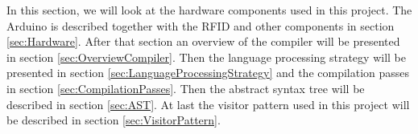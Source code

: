 In this section, we will look at the hardware components used in this project. The Arduino is described together with the RFID and other components in section \ref{sec:Hardware}. After that section an overview of the compiler will be presented in section \ref{sec:OverviewCompiler}. Then the language processing strategy will be presented in section \ref{sec:LanguageProcessingStrategy} and the compilation passes in section \ref{sec:CompilationPasses}. Then the abstract syntax tree will be described in section \ref{sec:AST}. At last the visitor pattern used in this project will be described in section \ref{sec:VisitorPattern}.